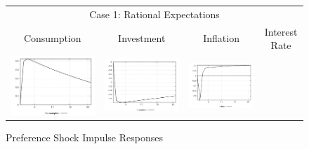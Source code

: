 \begin{figure}
\caption{Preference Shock Impulse Responses}\label{fg2:irf_pref}
\vspace*{1pc}\hspace*{-0.28in}
\begin{tabular}{cccc}
\multicolumn{4}{c}{Case 1: Rational Expectations}\\
Consumption & Investment & Inflation & Interest Rate \\ 
\includegraphics[scale=0.22]{results_re/Consumption_prefshock_irf.png} & 
\includegraphics[scale=0.22]{results_re/Investment_prefshock_irf.png} & 
\includegraphics[scale=0.22]{results_re/Inflation_prefshock_irf.png} & 

\end{tabular}
\end{figure}
